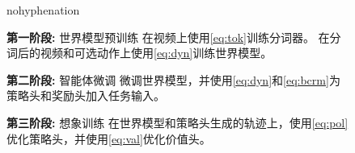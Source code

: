 \begin{figure}
\vspace*{-5ex}\hfill%
\begin{minipage}{0.43\textwidth}
\begin{algorithm}[H]
\caption{\enskip\method}
\label{alg:agent}
\begin{hyphenrules}{nohyphenation}

\begin{algorithmic}[1]
\setlength{\itemsep}{.5ex}

\vspace{1ex}
\Statex \hspace*{-2.3ex}\textbf{第一阶段:} 世界模型预训练
\State 在视频上使用\cref{eq:tok}训练分词器。
\State 在分词后的视频和可选动作上使用\cref{eq:dyn}训练世界模型。

\vspace{1ex}
\Statex \hspace*{-2.3ex}\textbf{第二阶段:} 智能体微调
\State 微调世界模型，并使用\cref{eq:dyn}和\cref{eq:bcrm}为策略头和奖励头加入任务输入。

\vspace{1ex}
\Statex \hspace*{-2.3ex}\textbf{第三阶段:} 想象训练
\State 在世界模型和策略头生成的轨迹上，使用\cref{eq:pol}优化策略头，并使用\cref{eq:val}优化价值头。
\vspace{1ex}

\end{algorithmic}
\end{hyphenrules}
\end{algorithm}
\end{minipage}
\end{figure}
